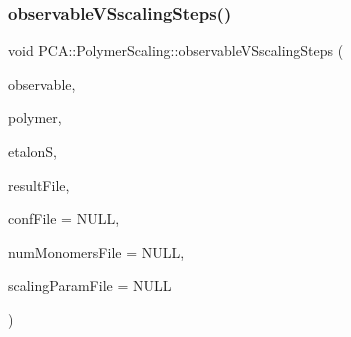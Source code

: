 \subsubsection{\texorpdfstring{observable\+V\+Sscaling\+Steps()}{observableVSscalingSteps()}}
{\footnotesize\ttfamily void P\+C\+A\+::\+Polymer\+Scaling\+::observable\+V\+Sscaling\+Steps (\begin{DoxyParamCaption}\item[{\hyperlink{class_p_c_a_1_1_polymer_scaling_aa4112660455a10f29c208c96655718c0}{Polymer\+Scaling\+::\+Observable}}]{observable,  }\item[{const \hyperlink{class_p_c_a_1_1_polymer}{Polymer} \&}]{polymer,  }\item[{const \hyperlink{class_p_c_a_1_1_polymer_scaling_1_1_scaling_param}{Scaling\+Param} \&}]{etalonS,  }\item[{char $\ast$}]{result\+File,  }\item[{char $\ast$}]{conf\+File = {\ttfamily NULL},  }\item[{char $\ast$}]{num\+Monomers\+File = {\ttfamily NULL},  }\item[{char $\ast$}]{scaling\+Param\+File = {\ttfamily NULL} }\end{DoxyParamCaption})\hspace{0.3cm}{\ttfamily [static]}}

\hypertarget{class_p_c_a_1_1_polymer_scaling_aca7d618f0d4ffe3edb9c72ce28839e4f}{}\label{class_p_c_a_1_1_polymer_scaling_aca7d618f0d4ffe3edb9c72ce28839e4f} 
